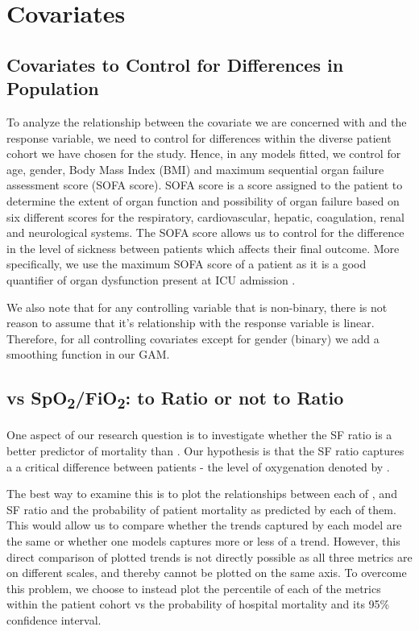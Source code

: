 
\chapter{Covariates } %

\label{ChapterX} %

\section{Covariates to Control for Differences in Population}

To analyze the relationship between the covariate we are concerned with and the response variable, we need to control for differences within the diverse patient cohort we have chosen for the study. Hence, in any models fitted, we control for age, gender, Body Mass Index (BMI) and maximum sequential organ failure assessment score (SOFA score). SOFA score is a score assigned to the patient to determine the extent of organ function and possibility of organ failure based on six different scores for the respiratory, cardiovascular, hepatic, coagulation, renal and neurological systems. The SOFA score allows us to control for the difference in the level of sickness between patients which affects their final outcome. More specifically, we use the maximum SOFA score of a patient as it is a good quantifier of organ dysfunction present at ICU admission \citep{moreno1999use}. 

We also note that for any controlling variable that is non-binary, there is not reason to assume that it's relationship with the response variable is linear. Therefore, for all controlling covariates except for gender (binary) we add a smoothing function in our GAM.

\section{\Sp vs SpO\textsubscript{2}/FiO\textsubscript{2}: to Ratio or not to Ratio}

One aspect of our research question is to investigate whether the SF ratio is a better predictor of mortality than \Sp. Our hypothesis is that the SF ratio captures a a critical difference between patients - the level of oxygenation denoted by \Fi. 

The best way to examine this is to plot the relationships between each of \Sp, \Fi and SF ratio and the probability of patient mortality as predicted by each of them. This would allow us to compare whether the trends captured by each model are the same or whether one models captures more or less of a trend. However, this direct comparison of plotted trends is not directly possible as all three metrics are on different scales, and thereby cannot be plotted on the same axis. To overcome this problem, we choose to instead plot the percentile of each of the metrics within the patient cohort vs the probability of hospital mortality and its 95\% confidence interval.  

